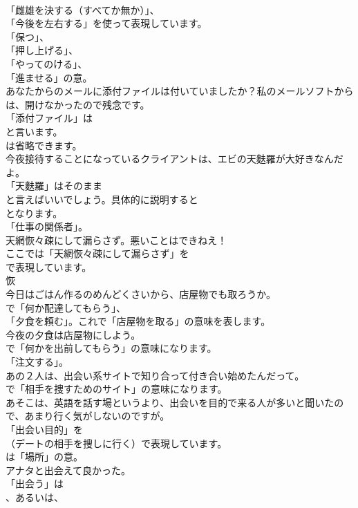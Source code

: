 \documentclass[8pt]{extreport}
\begin{document}
\begin{CJK}{UTF8}{min}
\\	「雌雄を決する（すべてか無か）」、
\\	「今後を左右する」を使って表現しています。
\\	「保つ」、
\\	「押し上げる」、
\\	「やってのける」、
\\	「進ませる」の意。	
\\	あなたからのメールに添付ファイルは付いていましたか？私のメールソフトからは、開けなかったので残念です。 
\\	「添付ファイル」は
\\	と言います。
\\	は省略できます。	
\\	今夜接待することになっているクライアントは、エビの天麩羅が大好きなんだよ。 
\\	「天麩羅」はそのまま
\\	と言えばいいでしょう。具体的に説明すると
\\	となります。
\\	「仕事の関係者」。	
\\	天網恢々疎にして漏らさず。悪いことはできねえ！ 
\\	ここでは「天網恢々疎にして漏らさず」を 
\\	で表現しています。	
\\	恢
\\	今日はごはん作るのめんどくさいから、店屋物でも取ろうか。 
\\	で「何か配達してもらう」、
\\	「夕食を頼む」。これで「店屋物を取る」の意味を表します。	
\\	今夜の夕食は店屋物にしよう。 
\\	で「何かを出前してもらう」の意味になります。
\\	「注文する」。	
\\	あの２人は、出会い系サイトで知り合って付き合い始めたんだって。 
\\	で「相手を捜すためのサイト」の意味になります。	
\\	あそこは、英語を話す場というより、出会いを目的で来る人が多いと聞いたので、あまり行く気がしないのですが。 
\\	「出会い目的」を 
\\	（デートの相手を捜しに行く）で表現しています。
\\	は「場所」の意。	
\\	アナタと出会えて良かった。 
\\	「出会う」は
\\	、あるいは、

\end{CJK}
\end{document}
